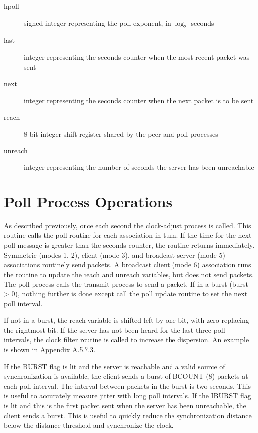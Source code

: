 \begin{description}

  \item[hpoll] signed integer representing the poll exponent, in $ \log_2 $ seconds

  \item[last] integer representing the seconds counter when the most recent
    packet was sent

  \item[next] integer representing the seconds counter when the next packet
    is to be sent

  \item[reach] 8-bit integer shift register shared by the peer and poll
    processes

  \item[unreach] integer representing the number of seconds the server has
    been unreachable

\end{description}

\section{Poll Process Operations}
\label{section-13-2}

As described previously, once each second the clock-adjust process is
called. This routine calls the poll routine for each association in
turn. If the time for the next poll message is greater than the
seconds counter, the routine returns immediately. Symmetric (modes
1, 2), client (mode 3), and broadcast server (mode 5) associations
routinely send packets. A broadcast client (mode 6) association runs
the routine to update the reach and unreach variables, but does not
send packets. The poll process calls the transmit process to send a
packet. If in a burst (burst > 0), nothing further is done except
call the poll update routine to set the next poll interval.

If not in a burst, the reach variable is shifted left by one bit,
with zero replacing the rightmost bit. If the server has not been
heard for the last three poll intervals, the clock filter routine is
called to increase the dispersion. An example is shown in
Appendix A.5.7.3.

If the BURST flag is lit and the server is reachable and a valid
source of synchronization is available, the client sends a burst of
BCOUNT (8) packets at each poll interval. The interval between
packets in the burst is two seconds. This is useful to accurately
measure jitter with long poll intervals. If the IBURST flag is lit
and this is the first packet sent when the server has been
unreachable, the client sends a burst. This is useful to quickly
reduce the synchronization distance below the distance threshold and
synchronize the clock.

